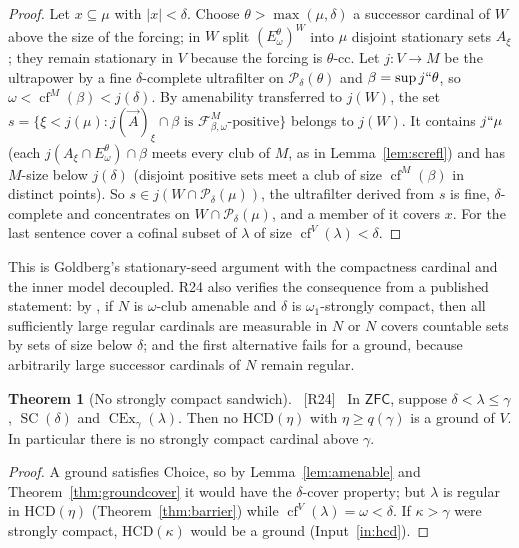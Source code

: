 \documentclass[11pt,letterpaper]{article}
\theoremstyle{definition}
\newtheorem{theorem}[definition]{Theorem}
\numberwithin{equation}{section}
\newcommand{\ZFC}{\mathsf{ZFC}}
\newcommand{\HCD}{\mathrm{HCD}}
\newcommand{\SC}{\operatorname{SC}}
\newcommand{\CEx}{\operatorname{CEx}}
\newcommand{\cf}{\operatorname{cf}}
\newcommand{\Pow}{\mathcal P}
\newcommand{\src}[1]{\unskip\ {\normalfont\small\sffamily\color{Olive}[#1]}\ }
\newcommand{\R}[1]{\textsf{R#1}}
\begin{document}
\begin{proof}
Let $x\subseteq\mu$ with $|x|<\delta$. Choose $\theta>\max(\mu,\delta)$ a successor cardinal of $W$ above the size of the forcing; in $W$ split $(E^\theta_\omega)^W$ into $\mu$ disjoint stationary sets $A_\xi$; they remain stationary in $V$ because the forcing is $\theta$-cc. Let $j:V\to M$ be the ultrapower by a fine $\delta$-complete ultrafilter on $\Pow_\delta(\theta)$ and $\beta=\sup j``\theta$, so $\omega<\cf^M(\beta)<j(\delta)$. By amenability transferred to $j(W)$, the set $s=\{\xi<j(\mu):j(\vec A)_\xi\cap\beta\text{ is }\mathcal F^M_{\beta,\omega}\text{-positive}\}$ belongs to $j(W)$. It contains $j``\mu$ (each $j(A_\xi\cap E^\theta_\omega)\cap\beta$ meets every club of $M$, as in Lemma~\ref{lem:screfl}) and has $M$-size below $j(\delta)$ (disjoint positive sets meet a club of size $\cf^M(\beta)$ in distinct points). So $s\in j(W\cap\Pow_\delta(\mu))$, the ultrafilter derived from $s$ is fine, $\delta$-complete and concentrates on $W\cap\Pow_\delta(\mu)$, and a member of it covers $x$. For the last sentence cover a cofinal subset of $\lambda$ of size $\cf^V(\lambda)<\delta$.
\end{proof}

This is Goldberg's stationary-seed argument with the compactness cardinal and the inner model decoupled. \R{24} also verifies the consequence from a published statement: by \cite[Lemma~2.7]{dichotomy}, if $N$ is $\omega$-club amenable and $\delta$ is $\omega_1$-strongly compact, then all sufficiently large regular cardinals are measurable in $N$ or $N$ covers countable sets by sets of size below $\delta$; and the first alternative fails for a ground, because arbitrarily large successor cardinals of $N$ remain regular.

\begin{theorem}[No strongly compact sandwich]\label{thm:sandwich}\src{R24}
In $\ZFC$, suppose $\delta<\lambda\le\gamma$, $\SC(\delta)$ and $\CEx_\gamma(\lambda)$. Then no $\HCD(\eta)$ with $\eta\ge q(\gamma)$ is a ground of $V$. In particular there is no strongly compact cardinal above $\gamma$.
\end{theorem}

\begin{proof}
A ground satisfies Choice, so by Lemma~\ref{lem:amenable} and Theorem~\ref{thm:groundcover} it would have the $\delta$-cover property; but $\lambda$ is regular in $\HCD(\eta)$ (Theorem~\ref{thm:barrier}) while $\cf^V(\lambda)=\omega<\delta$. If $\kappa>\gamma$ were strongly compact, $\HCD(\kappa)$ would be a ground (Input~\ref{in:hcd}).
\end{proof}
\end{document}

